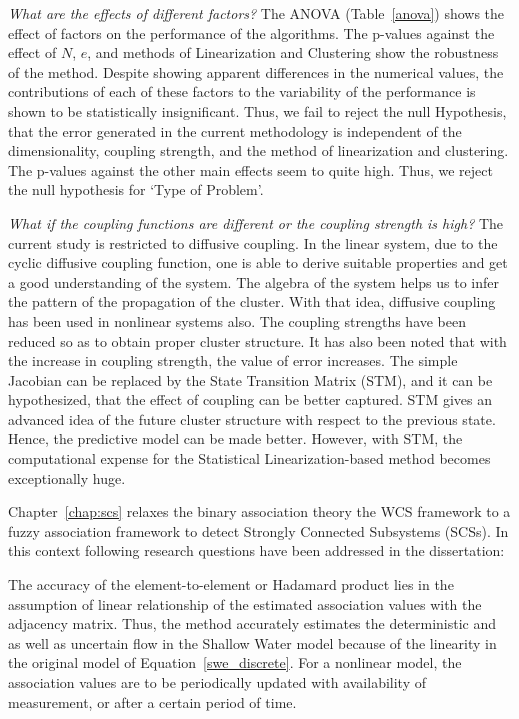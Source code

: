 \textit{What are the effects of different factors?}  The ANOVA (Table~\ref{anova}) shows the effect of factors on the performance of the algorithms. The p-values against the effect of $N$, $e$, and methods of Linearization and Clustering show the robustness of the method. Despite showing apparent differences in the numerical values, the contributions of each of these factors to the variability of the performance is shown to be statistically insignificant. Thus, we fail to reject the null Hypothesis, that the error generated in the current methodology is independent of the dimensionality, coupling strength, and the method of linearization and clustering. The p-values against the other main effects seem to quite high. Thus, we reject the null hypothesis for `Type of Problem'. 

\textit{What if the coupling functions are different or the coupling strength is high?} The current study is restricted to diffusive coupling. In the linear system, due to the cyclic diffusive coupling function, one is able to derive suitable properties and get a good understanding of the system. The algebra of the system helps us to infer the pattern of the propagation of the cluster. With that idea, diffusive coupling has been used in nonlinear systems also. The coupling strengths have been reduced so as to obtain proper cluster structure. It has also been noted that with the increase in coupling strength, the value of error increases. The simple Jacobian can be replaced by the State Transition Matrix (STM), and it can be hypothesized, that the effect of coupling can be better captured. STM gives an advanced idea of the future cluster structure with respect to the previous state. Hence, the predictive model can be made better. However, with STM, the computational expense for the Statistical Linearization-based method becomes exceptionally huge. 



Chapter~\ref{chap:scs} relaxes the binary association theory the WCS framework to a fuzzy association framework to detect Strongly Connected Subsystems (SCSs). In this context following research questions have been addressed in the dissertation:

The accuracy of the element-to-element or Hadamard product lies in the assumption of linear relationship of the estimated association values with the adjacency matrix. Thus, the method accurately estimates the deterministic and as well as uncertain flow in the Shallow Water model because of the linearity in the original model of Equation~\ref{swe_discrete}. For a nonlinear model, the association values are to be periodically updated with availability of measurement, or after a certain period of time. 

